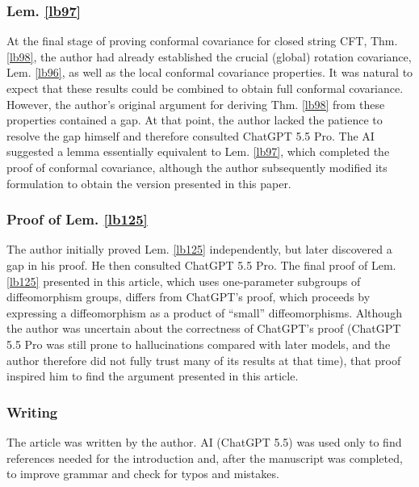\documentclass[11pt,b5paper,notitlepage]{article}
\theoremstyle{definition}
\theoremstyle{plain}
\numberwithin{equation}{section}
\begin{document}
\subsubsection*{Lem. \ref{lb97}}

At the final stage of proving conformal covariance for closed string CFT, Thm. \ref{lb98}, the author had already established the crucial (global) rotation covariance, Lem. \ref{lb96}, as well as the local conformal covariance properties. It was natural to expect that these results could be combined to obtain full conformal covariance. However, the author's original argument for deriving Thm. \ref{lb98} from these properties contained a gap. At that point, the author lacked the patience to resolve the gap himself and therefore consulted ChatGPT 5.5 Pro. The AI suggested a lemma essentially equivalent to Lem. \ref{lb97}, which completed the proof of conformal covariance, although the author subsequently modified its formulation to obtain the version presented in this paper.




\subsubsection*{Proof of Lem. \ref{lb125}}

The author initially proved Lem. \ref{lb125} independently, but later discovered a gap in his proof. He then consulted ChatGPT 5.5 Pro. The final proof of Lem. \ref{lb125} presented in this article, which uses one-parameter subgroups of diffeomorphism groups, differs from ChatGPT's proof, which proceeds by expressing a diffeomorphism as a product of “small” diffeomorphisms. Although the author was uncertain about the correctness of ChatGPT's proof (ChatGPT 5.5 Pro was still prone to hallucinations compared with later models, and the author therefore did not fully trust many of its results at that time), that proof inspired him to find the argument presented in this article.


\subsubsection*{Writing}

The article was written by the author. AI (ChatGPT 5.5) was used only to find references needed for the introduction and, after the manuscript was completed, to improve grammar and check for typos and mistakes.
\end{document}

